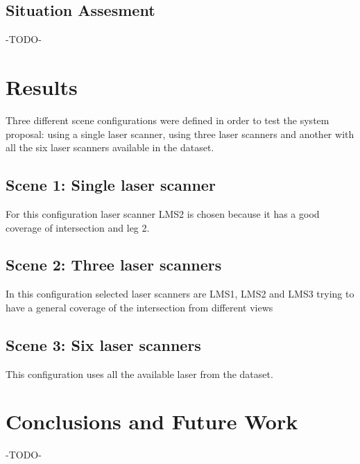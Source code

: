\documentclass[10pt,twocolumn,letterpaper]{article}
\begin{document}
\subsection{Situation Assesment}

-TODO-

\section{Results}

Three different scene configurations were defined in order to test the system proposal: using a single laser scanner, using three laser scanners and another with all the six laser scanners available in the dataset.


\subsection{Scene 1: Single laser scanner}

For this configuration laser scanner LMS2 is chosen because it has a good coverage of intersection and leg 2.

\subsection{Scene 2: Three laser scanners}

In this configuration selected laser scanners are LMS1, LMS2 and LMS3 trying to have a general coverage of the intersection from different views

\subsection{Scene 3: Six laser scanners}
This configuration uses all the available laser from the dataset.

\section{Conclusions and Future Work}

-TODO-

{\small


}
\end{document}
